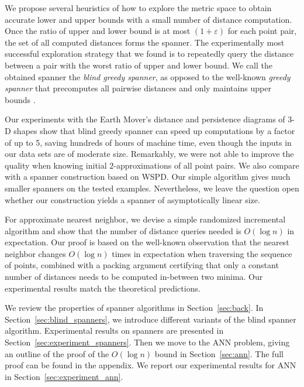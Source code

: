 \documentclass[]{ws-ijcga}
\newcommand{\eps}{\varepsilon}
\begin{document}
We propose several heuristics of how to explore the metric space to obtain accurate lower and upper bounds
with a small number of distance computation. Once the ratio of upper and lower bound is at most $(1+\eps)$
for each point pair, the set of all computed distances forms the spanner.
The experimentally most successful exploration strategy that we found is to
repeatedly query the distance between a pair with the worst ratio of upper and lower bound.
We call the obtained spanner the \emph{blind greedy spanner}, as opposed to the well-known
\emph{greedy spanner} that precomputes all pairwise distances and only maintains upper bounds \cite{althofer1993sparse}.


Our experiments with the Earth Mover's distance and persistence
diagrams of 3-D shapes show that blind greedy spanner can speed up computations
by a factor of up to 5, saving hundreds of hours of machine time,
even though the inputs in our data sets are of moderate size.
Remarkably, we were not able to improve the quality when knowing initial $2$-approximations of all point pairs.
We also compare with a spanner construction based on WSPD. Our simple algorithm gives much smaller
spanners on the tested examples. 
Nevertheless, we leave the question open whether our construction
yields a spanner of asymptotically linear size. 

For approximate nearest neighbor, we devise a simple randomized incremental algorithm and show that
the number of distance queries needed is $O(\log n)$ in expectation.
Our proof is based on the well-known observation that the nearest neighbor changes $O(\log n)$ times
in expectation when traversing the sequence of points, combined with a packing argument certifying that
only a constant number of distances needs to be computed in-between two minima.
Our experimental results match the theoretical predictions.

We review the properties of spanner algorithms in Section~\ref{sec:back}.
In Section~\ref{sec:blind_spanners}, we introduce different
variants of the blind spanner algorithm. Experimental
results on spanners are presented in Section~\ref{sec:experiment_spanners}.
Then we move to the ANN problem, giving
an outline of the proof of the $O(\log n)$ bound in Section~\ref{sec:ann}.
The full proof can be found in the appendix.
We report our experimental results for ANN in Section~\ref{sec:experiment_ann}.
\end{document}
